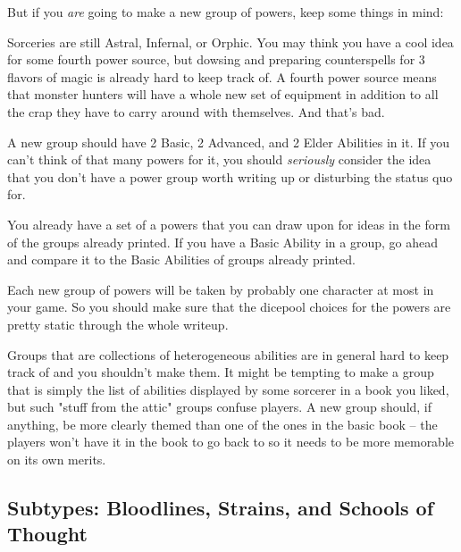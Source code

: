 But if you \textit{are} going to make a new group of powers, keep some things in mind:

\begin{itemize*}
\item Sorceries are still Astral, Infernal, or Orphic. You may think you have a cool idea for some fourth power source, but dowsing and preparing counterspells for 3 flavors of magic is already hard to keep track of. A fourth power source means that monster hunters will have a whole new set of equipment in addition to all the crap they have to carry around with themselves. And that's bad.

\item A new group should have 2 Basic, 2 Advanced, and 2 Elder Abilities in it. If you can't think of that many powers for it, you should \textit{seriously} consider the idea that you don't have a power group worth writing up or disturbing the status quo for.

\item You already have a set of a powers that you can draw upon for ideas in the form of the groups already printed. If you have a Basic Ability in a group, go ahead and compare it to the Basic Abilities of groups already printed.

\item Each new group of powers will be taken by probably one character at most in your game. So you should make sure that the dicepool choices for the powers are pretty static through the whole writeup. 

\item Groups that are collections of heterogeneous abilities are in general hard to keep track of and you shouldn't make them. It might be tempting to make a group that is simply the list of abilities displayed by some sorcerer in a book you liked, but such "stuff from the attic" groups confuse players. A new group should, if anything, be more clearly themed than one of the ones in the basic book -- the players won't have it in the book to go back to so it needs to be more memorable on its own merits.
\end{itemize*}

\subsection[Subtypes]{Subtypes: Bloodlines, Strains, and Schools of Thought}


